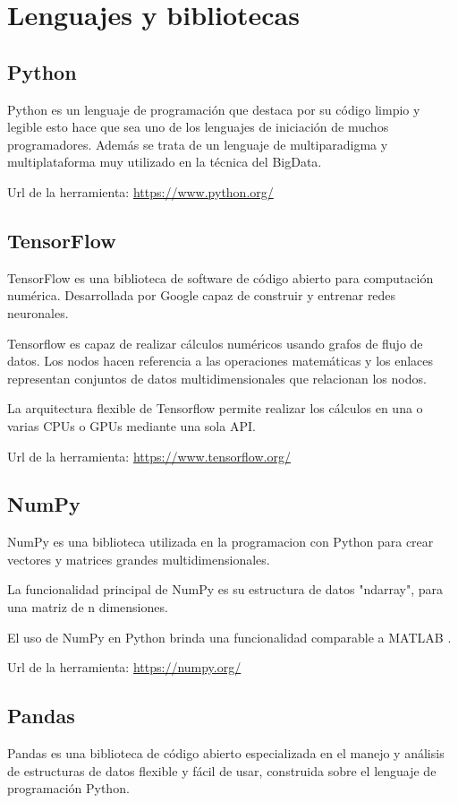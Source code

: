 \section{Lenguajes y bibliotecas}

\subsection{Python}
Python es un lenguaje de programación que destaca por su código limpio y legible esto hace que sea uno de los lenguajes de iniciación de muchos programadores.
Además se trata de un lenguaje de multiparadigma y multiplataforma muy utilizado en la técnica del BigData.

Url de la herramienta: \url{https://www.python.org/}

\subsection{TensorFlow}
TensorFlow es una biblioteca de software de código abierto para computación numérica. Desarrollada por Google capaz de construir y entrenar redes neuronales.

Tensorflow es capaz de realizar cálculos
numéricos usando grafos de flujo de datos. Los nodos hacen referencia a las operaciones matemáticas y los enlaces representan conjuntos de datos multidimensionales que relacionan los nodos.

La arquitectura flexible de Tensorflow permite realizar los cálculos en una o varias CPUs o GPUs mediante una sola API.

Url de la herramienta: \url{https://www.tensorflow.org/}

\subsection{NumPy}
NumPy es una biblioteca utilizada en la programacion con Python para crear vectores y matrices grandes multidimensionales.

La funcionalidad principal de NumPy es su estructura de datos "ndarray", para una matriz de n dimensiones.

El uso de NumPy en Python brinda una funcionalidad comparable a MATLAB \cite{Matlab}.

Url de la herramienta: \url{https://numpy.org/}

\subsection{Pandas}
Pandas es una biblioteca de código abierto especializada en el manejo y análisis de estructuras de datos flexible y fácil de usar, construida sobre el lenguaje de programación Python.

